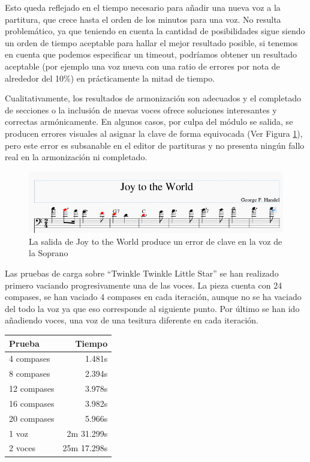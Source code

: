 Esto queda reflejado en el tiempo necesario para añadir una nueva voz a la partitura, que crece hasta el orden de los minutos para una voz. No resulta problemático, ya que teniendo en cuenta la cantidad de posibilidades sigue siendo un orden de tiempo aceptable para hallar el mejor resultado posible, si tenemos en cuenta que podemos especificar un timeout, podríamos obtener un resultado aceptable (por ejemplo una voz nueva con una ratio de errores por nota de alrededor del 10\%) en prácticamente la mitad de tiempo.

Cualitativamente, los resultados de armonización son adecuados y el completado de secciones o la inclusión de nuevas voces ofrece soluciones interesantes y correctas armónicamente. En algunos casos, por culpa del módulo se salida, se producen errores visuales al asignar la clave de forma equivocada (Ver Figura \ref{fig:joy_harm_err}), pero este error es subsanable en el editor de partituras y no presenta ningún fallo real en la armonización ni completado. 

\begin{figure}
    	\centering
    	\includegraphics[width=0.9\linewidth]{imagenes/evaluation/joy_harm_err.png}
    	\caption{La salida de Joy to the World produce un error de clave en la voz de la Soprano}
    	\label{fig:joy_harm_err}
\end{figure}

Las pruebas de carga sobre ``Twinkle Twinkle Little Star'' se han realizado primero vaciando progresivamente una de las voces. La pieza cuenta con 24 compases, se han vaciado 4 compases en cada iteración, aunque no se ha vaciado del todo la voz ya que eso corresponde al siguiente punto. Por último se han ido añadiendo voces, una voz de una tesitura diferente en cada iteración.
\begin{center}
	\begin{tabular}{ | l | r | }
		\hline
		Prueba & Tiempo \\ \hline
		4 compases  & 1.481s \\ \hline
		8 compases 	& 2.394s \\ \hline
		12 compases	& 3.978s \\ \hline
		16 compases & 3.982s \\ \hline
		20 compases & 5.966s \\ \hline
		1 voz & 2m 31.299s \\ \hline
		2 voces & 25m 17.298s  \\ \hline
	\end{tabular}
\end{center}

